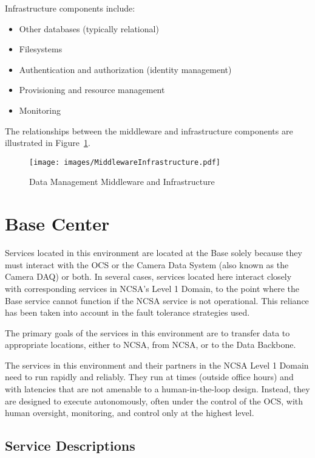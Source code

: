 \documentclass[DM,toc]{lsstdoc}
\begin{document}
Infrastructure components include:
\begin{itemize}
\item
  Other databases (typically relational)
\item
  Filesystems
\item
  Authentication and authorization (identity management)
\item
  Provisioning and resource management
\item
  Monitoring
\end{itemize}

The relationships between the middleware and infrastructure components
are illustrated in Figure~\ref{fig:mwandinfra}.

\begin{figure}
\centering
\texttt{[image: images/MiddlewareInfrastructure.pdf]}
\caption{Data Management Middleware and Infrastructure}
\label{fig:mwandinfra}
\end{figure}

\section{Base Center}\label{base-center}

Services located in this environment are located at the Base solely because
they must interact with the OCS or the Camera Data System (also known as
the Camera DAQ) or both. In several cases, services located here
interact closely with corresponding services in NCSA's Level
1 Domain, to the point where the Base service cannot function if the
NCSA service is not operational. This reliance has been taken into
account in the fault tolerance strategies used.

The primary goals of the services in this environment are to transfer data
to appropriate locations, either to NCSA, from NCSA, or to the Data
Backbone.

The services in this environment and their partners in the NCSA
Level 1 Domain need to run rapidly and reliably. They run at times
(outside office hours) and with latencies that are not amenable to a
human-in-the-loop design. Instead, they are designed to execute
autonomously, often under the control of the OCS, with human oversight,
monitoring, and control only at the highest level.

\subsection{Service Descriptions}\label{base-service-descriptions}
\end{document}
